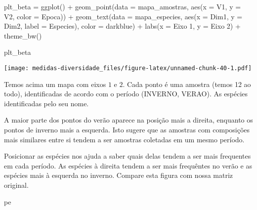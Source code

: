 \documentclass[
]{book}
\newenvironment{Shaded}{\begin{snugshade}}{\end{snugshade}}
\newcommand{\AttributeTok}[1]{\textcolor[rgb]{0.77,0.63,0.00}{#1}}
\newcommand{\FunctionTok}[1]{\textcolor[rgb]{0.00,0.00,0.00}{#1}}
\newcommand{\NormalTok}[1]{#1}
\newcommand{\OtherTok}[1]{\textcolor[rgb]{0.56,0.35,0.01}{#1}}
\newcommand{\SpecialCharTok}[1]{\textcolor[rgb]{0.00,0.00,0.00}{#1}}
\newcommand{\StringTok}[1]{\textcolor[rgb]{0.31,0.60,0.02}{#1}}
\begin{document}
\begin{Shaded}
\begin{Highlighting}[]
\NormalTok{plt\_beta }\OtherTok{=} \FunctionTok{ggplot}\NormalTok{() }\SpecialCharTok{+}
  \FunctionTok{geom\_point}\NormalTok{(}\AttributeTok{data =}\NormalTok{ mapa\_amostras,}
             \FunctionTok{aes}\NormalTok{(}\AttributeTok{x =}\NormalTok{ V1, }\AttributeTok{y =}\NormalTok{ V2, }\AttributeTok{color =}\NormalTok{ Epoca)) }\SpecialCharTok{+}
  \FunctionTok{geom\_text}\NormalTok{(}\AttributeTok{data =}\NormalTok{ mapa\_especies,}
             \FunctionTok{aes}\NormalTok{(}\AttributeTok{x =}\NormalTok{ Dim1, }\AttributeTok{y =}\NormalTok{ Dim2, }\AttributeTok{label =}\NormalTok{ Especies), }
            \AttributeTok{color =} \StringTok{\textquotesingle{}darkblue\textquotesingle{}}\NormalTok{) }\SpecialCharTok{+}
  \FunctionTok{labs}\NormalTok{(}\AttributeTok{x =} \StringTok{\textquotesingle{}Eixo 1\textquotesingle{}}\NormalTok{, }\AttributeTok{y =} \StringTok{\textquotesingle{}Eixo 2\textquotesingle{}}\NormalTok{) }\SpecialCharTok{+}
  \FunctionTok{theme\_bw}\NormalTok{()}

\NormalTok{plt\_beta}
\end{Highlighting}
\end{Shaded}

\texttt{[image: medidas-diversidade\_files/figure-latex/unnamed-chunk-40-1.pdf]}

Temos acima um mapa com eixos \(1\) e \(2\). Cada ponto é uma amostra (temos 12 ao todo), identificadas de acordo com o período (INVERNO, VERAO). As espécies identificadas pelo seu nome.

A maior parte dos pontos do verão aparece na posição mais a direita, enquanto os pontos de inverno mais a esquerda. Isto sugere que as amostras com composições mais similares entre si tendem a ser amostras coletadas em um mesmo período.

Posicionar as espécies nos ajuda a saber quais delas tendem a ser mais frequentes em cada período. As espécies à direita tendem a ser mais frequêntes no verão e as espécies mais à esquerda no inverno. Compare esta figura com nossa matriz original.

\begin{Shaded}
\begin{Highlighting}[]
\NormalTok{pe}
\end{Highlighting}
\end{Shaded}
\end{document}
